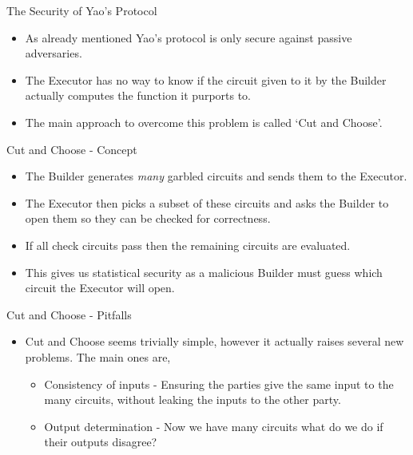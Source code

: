 \documentclass[t, 12pt]{beamer}            %
\begin{document}
\begin{frame}{The Security of Yao's Protocol}
	\begin{itemize} %
		\item As already mentioned Yao's protocol is only secure against passive adversaries. \footnotemark
		\item The Executor has no way to know if the circuit given to it by the Builder actually computes the function it purports to.
		\item The main approach to overcome this problem is called `Cut and Choose'.
	\end{itemize}
	
\end{frame}


\begin{frame}{Cut and Choose - Concept}
	\begin{itemize} %
		\item The Builder generates \emph{many} garbled circuits and sends them to the Executor.
		\item The Executor then picks a subset of these circuits and asks the Builder to open them so they can be checked for correctness.
		\item If all check circuits pass then the remaining circuits are evaluated.
		\item This gives us statistical security as a malicious Builder must guess which circuit the Executor will open.
	\end{itemize}
\end{frame}


\begin{frame}{Cut and Choose - Pitfalls}
	\begin{itemize} %
		\item Cut and Choose seems trivially simple, however it actually raises several new problems. The main ones are,
		\begin{itemize}
			\item Consistency of inputs - Ensuring the parties give the same input to the many circuits, without leaking the inputs to the other party.
			\item Output determination - Now we have many circuits what do we do if their outputs disagree?
		\end{itemize}
	\end{itemize}

\end{frame}
\end{document}
